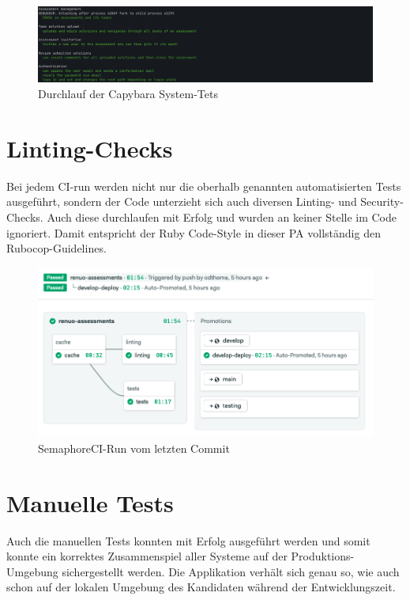 \begin{figure}[H]
  \centering
  \includegraphics[width=\textwidth]{images/system-tests.png}
  \caption{\label{fig:system-tests}Durchlauf der Capybara System-Tets}
\end{figure}

\section{Linting-Checks}

Bei jedem CI-run werden nicht nur die oberhalb genannten automatisierten Tests ausgeführt, sondern der Code unterzieht sich auch diversen Linting- und Security-Checks.
Auch diese durchlaufen mit Erfolg und  wurden an keiner Stelle im Code ignoriert. Damit entspricht der Ruby Code-Style in dieser PA vollständig den Rubocop-Guidelines.

\begin{figure}[H]
  \centering
  \includegraphics[width=\textwidth]{images/ci.png}
  \caption{\label{fig:semaphoreci}SemaphoreCI-Run vom letzten Commit}
\end{figure}

\section{Manuelle Tests}

Auch die manuellen Tests konnten mit Erfolg ausgeführt werden und somit konnte ein korrektes Zusammenspiel aller Systeme auf der Produktions-Umgebung 
sichergestellt werden. Die Applikation verhält sich genau so, wie auch schon auf der lokalen Umgebung des Kandidaten während der Entwicklungszeit.

